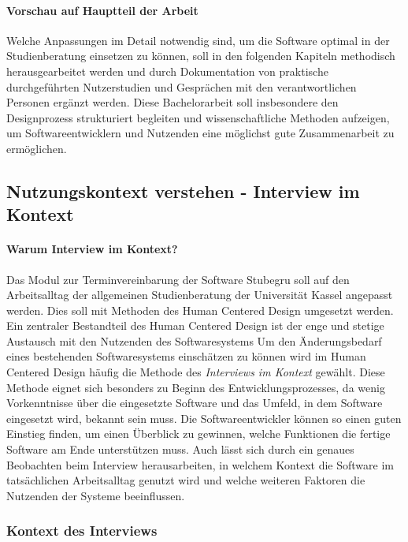 \documentclass[12pt]{article}
\begin{document}
\paragraph{Vorschau auf Hauptteil der Arbeit}
Welche Anpassungen im Detail notwendig sind, um die Software optimal in der
Studienberatung einsetzen zu können, soll in den folgenden Kapiteln methodisch
herausgearbeitet werden und durch Dokumentation von praktische durchgeführten
Nutzerstudien und Gesprächen mit den verantwortlichen Personen ergänzt werden.
Diese Bachelorarbeit soll insbesondere den Designprozess strukturiert begleiten
und wissenschaftliche Methoden aufzeigen, um Softwareentwicklern und Nutzenden
eine möglichst gute Zusammenarbeit zu ermöglichen.

\subsection{Nutzungskontext verstehen - Interview im Kontext}

\paragraph{Warum Interview im Kontext?}
Das Modul zur Terminvereinbarung der Software Stubegru soll auf den
Arbeitsalltag der allgemeinen Studienberatung der Universität Kassel angepasst
werden. Dies soll mit Methoden des Human Centered Design umgesetzt werden. Ein
zentraler Bestandteil des Human Centered Design ist der enge und stetige
Austausch mit den Nutzenden des Softwaresystems \cite{hci}  Um den Änderungsbedarf eines bestehenden Softwaresystems einschätzen
zu können wird im Human Centered Design häufig die Methode des
\textit{Interviews im Kontext} gewählt.\cite{contextualDesign} Diese Methode
eignet sich besonders zu Beginn des Entwicklungsprozesses, da wenig
Vorkenntnisse über die eingesetzte Software und das Umfeld, in dem Software
eingesetzt wird, bekannt sein muss. Die Softwareentwickler können so einen
guten Einstieg finden, um einen Überblick zu gewinnen, welche Funktionen die
fertige Software am Ende unterstützen muss. Auch lässt sich durch ein genaues
Beobachten beim Interview herausarbeiten, in welchem Kontext die Software im
tatsächlichen Arbeitsalltag genutzt wird und welche weiteren Faktoren die
Nutzenden der Systeme beeinflussen.

\subsubsection{Kontext des Interviews}
\end{document}
